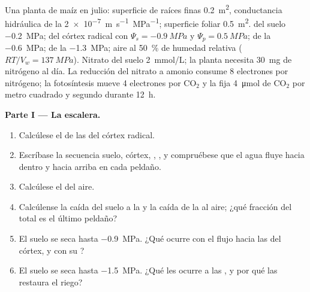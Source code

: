 \begin{problem}
\label{pb:b1:plant-water-minerals:1}
Una planta de maíz en julio: superficie de raíces finas \qty{0.2}{m^2},
conductancia hidráulica de la  \qty{2e-7}{m.s^{-1}.MPa^{-1}}; superficie
foliar \qty{0.5}{m^2}.  del suelo \qty{-0.2}{MPa}; 
del córtex radical con $\Psi_s = \qty{-0.9}{MPa}$ y $\Psi_p = \qty{0.5}{MPa}$;  de la  \qty{-0.6}{MPa};  de la 
\qty{-1.3}{MPa}; aire al \qty{50}{\%} de humedad relativa ($RT/V_w = \qty{137}{MPa}$). Nitrato del suelo \qty{2}{mmol/L}; la planta necesita
\qty{30}{mg} de nitrógeno al día. La reducción del nitrato a amonio consume
8 electrones por nitrógeno; la fotosíntesis mueve 4 electrones por
$\mathrm{CO_2}$ y la  fija \qty{4}{\micro mol} de $\mathrm{CO_2}$ por
metro cuadrado y segundo durante \qty{12}{h}.

\medskip
\noindent\textbf{Parte I --- La escalera.}
\begin{enumerate}
  \item Calcúlese el  de las  del córtex radical.
  \item Escríbase la secuencia suelo, córtex, , , y compruébese
        que el agua fluye hacia dentro y hacia arriba en cada peldaño.
  \item Calcúlese el  del aire.
  \item Calcúlense la caída del suelo a la  y la caída de la  al
        aire; ¿qué fracción del total es el último peldaño?
  \item El suelo se seca hasta \qty{-0.9}{MPa}. ¿Qué ocurre con el flujo
        hacia las  del córtex, y con su ?
  \item El suelo se seca hasta \qty{-1.5}{MPa}. ¿Qué les ocurre a las ,
        y por qué las restaura el riego?
\end{enumerate}


\end{problem}
